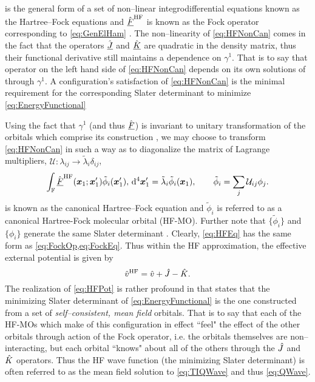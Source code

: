  is the general form of a set of non--linear integrodifferential equations known as the Hartree--Fock equations and $\hat{\underline{F}}^{\mathrm{HF}}$ is
known as the Fock operator corresponding to \cref{eq:GenElHam} . The non--linearity of \cref{eq:HFNonCan} comes in the fact that the operators
$\hat{\underline{J}}$ and $\hat{\underline{K}}$ are quadratic in the density matrix, thus their functional derivative still maintains a dependence on $\gamma^1$. That is to
say that operator on the left hand side of \cref{eq:HFNonCan} depends on its own solutions of through $\gamma^1$. A configuration's satisfaction of
\cref{eq:HFNonCan} is the minimal requirement for the corresponding Slater determinant to minimize \cref{eq:EnergyFunctional}

Using the fact that $\gamma^1$ (and thus $\hat{\underline{F}}$) is invariant to unitary transformation of the orbitals which comprise its construction \cite{Ostlund12_book,Yang89_book},
we may choose to transform \cref{eq:HFNonCan} in such a way as to diagonalize the matrix of Lagrange multipliers, 
$\mathcal U: \lambda_{ij} \rightarrow \tilde\lambda_{i} \delta_{ij}$,
\begin{equation}
\label{eq:HFEq}
\int_{\mathbb F} \hat{\underline{F}}^{\mathrm{HF}}(\boldsymbol{x}_1; \boldsymbol{x}_1') \tilde\phi_i(\boldsymbol{x}_1'), \,\mathrm{d}^4\boldsymbol{x}'_1 = \tilde\lambda_i \tilde\phi_i(\boldsymbol{x}_1), 
  \qquad \tilde\phi_i = \sum_j\mathcal U_{ij}\phi_j. 
\end{equation}
 is known as the canonical Hartree--Fock equation and $\tilde \phi_i$ is referred to as a canonical Hartree-Fock molecular orbital (HF-MO). 
Further note that $\{\tilde \phi_i\}$ and $\{\phi_i\}$ generate the same Slater determinant .
Clearly, \cref{eq:HFEq} has the same form as \cref{eq:FockOp,eq:FockEq}. Thus within the HF approximation, the effective external potential
is given by
\begin{equation}
\label{eq:HFPot}
\hat{v}^\mathrm{HF} = \hat{v} + \hat{J} - \hat{K}.
\end{equation}
The realization of \cref{eq:HFPot} is rather profound in that states that the minimizing Slater determinant of \cref{eq:EnergyFunctional}
is the one constructed from a set of \emph{self--consistent, mean field} orbitals. That is to say that each of the HF-MOs which make of
this configuration in effect ``feel" the effect of the other orbitals through action of the Fock operator, i.e. the orbitals themselves 
are non--interacting, but each orbital ``knows" about all of the others through the $\hat{J}$ and $\hat{K}$ operators. Thus the HF wave function
(the minimizing Slater determinant) is often referred to as the mean field solution to \cref{eq:TIQWave} and thus \cref{eq:QWave}.


